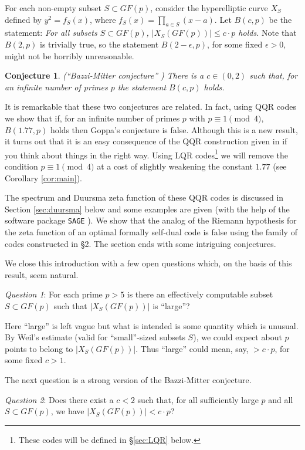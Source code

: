 \documentclass[submission%
]{dmtcs}
\newtheorem{conjecture}{Conjecture}
\begin{document}
For each non-empty subset $S\subset GF(p)$, consider 
the hyperelliptic curve $X_S$ defined by $y^2=f_S(x)$, where 
$f_S(x) = \prod_{a\in S}(x-a)$.  
Let $B(c,p)$ be the statement: {\it For all subsets $S\subset GF(p)$, 
$|X_S(GF(p))| \leq  c\cdot p$ holds.} Note that $B(2,p)$ is
trivially true, so the statement $B(2-\epsilon,p)$, for some fixed 
$\epsilon >0$, might not be horribly unreasonable.

\begin{conjecture}
(``Bazzi-Mitter conjecture'' \cite{BM})
There is a $c\in (0,2)$ such that, for an infinite number of primes 
$p$ the statement $B(c,p)$ holds.
\end{conjecture}

It is remarkable that these two conjectures are related.
In fact, using QQR codes we show that if, for an infinite number of primes 
$p$ with $p\equiv 1\pmod 4$, $B(1.77,p)$ holds then 
Goppa's conjecture is false.
Although this is a new result, it turns out that it is
an easy consequence of the QQR construction given in \cite{BM} 
if you think about things in the right way. Using LQR 
codes\footnote{These codes will be defined in \S \ref{sec:LQR} below.}
we will remove the condition $p\equiv 1\pmod 4$ at a cost of slightly
weakening the constant $1.77$ (see Corollary \ref{cor:main}).

The spectrum and Duursma zeta function of these QQR codes is discussed in 
Section \ref{sec:duursma} below and 
some examples are given (with the help of the software
package {\tt SAGE} \cite{S}). 
We show that the analog of the Riemann hypothesis for the
zeta function of an optimal formally self-dual code is false 
using the family of codes
constructed in \S 2. The section ends with
some intriguing conjectures.

We close this introduction with a few open questions which, on the basis
of this result, seem natural.

{\it Question 1}: For each prime $p>5$ is there an 
effectively computable subset $S\subset GF(p)$ such that
$|X_S(GF(p))|$ is ``large''?

Here ``large'' is left vague but what is intended is
some quantity which is unusual. By Weil's estimate
(valid for ``small''-sized subsets $S$), we could expect
about $p$ points to belong to $|X_S(GF(p))|$. Thus ``large''
could mean, say, $>c\cdot p$, for some fixed $c>1$.

The next question is a strong version of the 
Bazzi-Mitter conjecture.

{\it Question 2}: Does there exist a $c<2$ such that, 
for all sufficiently large $p$ and all $S\subset GF(p)$, we have
$|X_S(GF(p))| < c\cdot p$?
\end{document}
